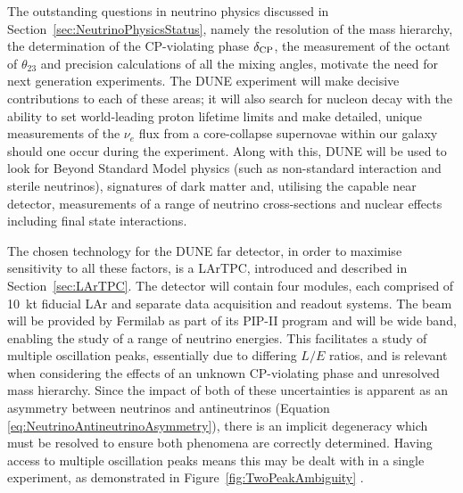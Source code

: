 The outstanding questions in neutrino physics discussed in Section~\ref{sec:NeutrinoPhysicsStatus}, namely the resolution of the mass hierarchy, the determination of the CP-violating phase $\delta_{\textnormal{CP}}$, the measurement of the octant of $\theta_{23}$ and precision calculations of all the mixing angles, motivate the need for next generation experiments.  The DUNE experiment will make decisive contributions to each of these areas; it will also search for nucleon decay with the ability to set world-leading proton lifetime limits and make detailed, unique measurements of the $\nu_e$ flux from a core-collapse supernovae within our galaxy should one occur during the experiment.  Along with this, DUNE will be used to look for Beyond Standard Model physics (such as non-standard interaction and sterile neutrinos), signatures of dark matter and, utilising the capable near detector, measurements of a range of neutrino cross-sections and nuclear effects including final state interactions.

The chosen technology for the DUNE far detector, in order to maximise sensitivity to all these factors, is a LArTPC, introduced and described in Section~\ref{sec:LArTPC}.  The detector will contain four modules, each comprised of 10~kt fiducial LAr and separate data acquisition and readout systems.  The beam will be provided by Fermilab as part of its PIP-II program \cite{PIPII2013} and will be wide band, enabling the study of a range of neutrino energies.  This facilitates a study of multiple oscillation peaks, essentially due to differing $L/E$ ratios, and is relevant when considering the effects of an unknown CP-violating phase and unresolved mass hierarchy.  Since the impact of both of these uncertainties is apparent as an asymmetry between neutrinos and antineutrinos (Equation \ref{eq:NeutrinoAntineutrinoAsymmetry}), there is an implicit degeneracy which must be resolved to ensure both phenomena are correctly determined.  Having access to multiple oscillation peaks means this may be dealt with in a single experiment, as demonstrated in Figure~\ref{fig:TwoPeakAmbiguity} \cite{Huber2011}.

